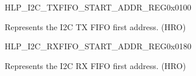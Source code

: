     \begin{register}{H}{LP\_I2C\_TXFIFO\_START\_ADDR\_REG}{0x0100}\label{regdesc:LPI2CTXFIFOSTARTADDRREG}
    \regnewline%
    \begin{regdesc}\begin{reglist}
    \label{fielddesc:LPI2CTXFIFOSTARTADDR}\item [LP\_I2C\_TXFIFO\_START\_ADDR] Represents the I2C TX FIFO first address. (HRO)
    \end{reglist}\end{regdesc}
    \end{register}


    \begin{register}{H}{LP\_I2C\_RXFIFO\_START\_ADDR\_REG}{0x0180}\label{regdesc:LPI2CRXFIFOSTARTADDRREG}
    \regnewline%
    \begin{regdesc}\begin{reglist}
    \label{fielddesc:LPI2CRXFIFOSTARTADDR}\item [LP\_I2C\_RXFIFO\_START\_ADDR] Represents the I2C RX FIFO first address. (HRO)
    \end{reglist}\end{regdesc}
    \end{register}
